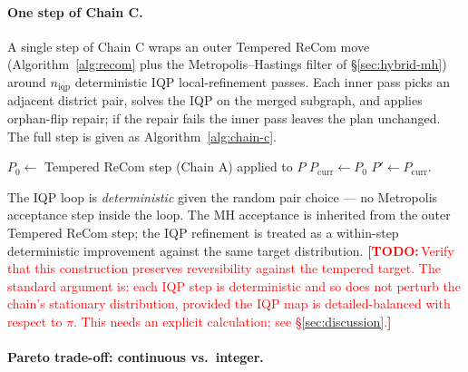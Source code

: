 \documentclass[11pt]{article}
\newcommand{\todo}[1]{\textcolor{red}{\textbf{[TODO:}\,#1\textbf{]}}}
\begin{document}
\paragraph{One step of Chain C.}\label{sec:chain-c-step}
A single step of Chain C wraps an outer Tempered ReCom move
(Algorithm~\ref{alg:recom} plus the Metropolis--Hastings filter of
\S\ref{sec:hybrid-mh}) around $n_{\mathrm{iqp}}$ deterministic
IQP local-refinement passes. Each inner pass picks an adjacent district
pair, solves the IQP on the merged subgraph, and applies orphan-flip
repair; if the repair fails the inner pass leaves the plan unchanged.
The full step is given as Algorithm~\ref{alg:chain-c}.

\begin{algorithm}[H]
\caption{One step of Chain C}\label{alg:chain-c}
$P_0 \gets $ Tempered ReCom step (Chain A) applied to $P$\;
$P_{\mathrm{curr}} \gets P_0$\;
\Return $P' \gets P_{\mathrm{curr}}$.
\end{algorithm}

The IQP loop is \emph{deterministic} given the random pair choice ---
no Metropolis acceptance step inside the loop. The MH acceptance is
inherited from the outer Tempered ReCom step; the IQP refinement is
treated as a within-step deterministic improvement against the same
target distribution. \todo{Verify that this construction preserves
reversibility against the tempered target. The standard argument is:
each IQP step is deterministic and so does not perturb the chain's
stationary distribution, provided the IQP map is detailed-balanced
with respect to $\pi$. This needs an explicit calculation; see
\S\ref{sec:discussion}.}

\paragraph{Pareto trade-off: continuous vs.\ integer.}\label{sec:iqp-pareto}
\end{document}
